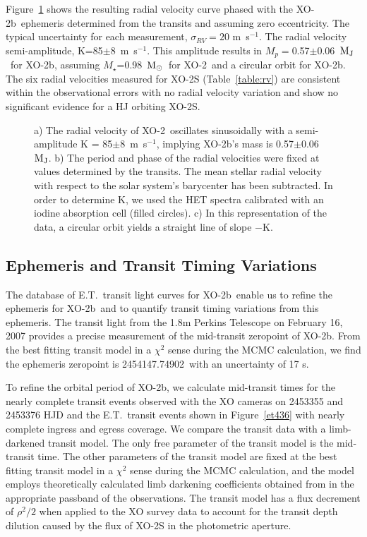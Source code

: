 \documentclass{emulateapj}
\newcommand{\mps}{m~s$^{-1}$}
\newcommand{\Msun}{${\rm M_\odot}$}
\newcommand{\Mjup}{${\rm M_J}$}
\newcommand{\xonb}{XO-2b}
\newcommand{\xon}{XO-2}
\newcommand{\vMs}{0.98}
\newcommand{\vrvK}{85}
\newcommand{\ervK}{8}
\newcommand{\vjd}{2454147.74902}
\newcommand{\vMp}{0.57}
\newcommand{\eMp}{0.06}
\begin{document}
Figure~\ref{rvnorth} shows the resulting radial velocity curve phased
with the \xonb\ ephemeris determined from the transits and assuming
zero eccentricity.  The typical uncertainty for each measurement,
$\sigma_{RV}=20$ \mps.  The radial velocity semi-amplitude,
K=\vrvK$\pm$\ervK\ \mps.  This amplitude results in
$M_{p}=$\vMp$\pm$\eMp\ \Mjup\ for \xonb, assuming $M_{\star}$=\vMs\
\Msun\ for \xon\ and a circular orbit for \xonb.  The six radial
velocities measured for \xon S (Table~\ref{table:rv}) are consistent
within the observational errors with no radial velocity variation and
show no significant evidence for a HJ orbiting \xon S.


\begin{figure}
\caption{a) The radial velocity of \xon\ oscillates sinusoidally with a
semi-amplitude K = \vrvK$\pm$\ervK\ \mps, implying \xonb's mass is
\vMp$\pm$\eMp\ \Mjup. b) The
period and phase of the radial velocities were fixed at values
determined by the transits. The mean stellar radial velocity with
respect to the solar system's barycenter has been subtracted.  In
order to determine K, we used the HET spectra calibrated with an
iodine absorption cell (filled circles).   c) In this representation
of the data, a circular orbit yields a straight line of slope $-$K.
\label{rvnorth}}
\end{figure}


\subsection{Ephemeris and Transit Timing Variations}\label{sec:ttv}

The database of E.T.\ transit light curves for \xonb\ enable us to
refine the ephemeris for \xonb\ and to quantify transit timing
variations from this ephemeris.  The transit light from the 1.8m
Perkins Telescope on February 16, 2007 provides a precise measurement
of the mid-transit zeropoint of \xonb.  From the best fitting transit
model in a $\chi^{2}$ sense during the MCMC calculation,
we find the ephemeris zeropoint is
\vjd\ with an uncertainty of 17 s.

To refine the orbital period of \xonb, we calculate mid-transit times
for the nearly complete transit events observed with the XO cameras on
2453355 and 2453376 HJD and the E.T.\ transit events shown in
Figure~\ref{et436} with nearly complete ingress and egress coverage.
We compare the transit data with a limb-darkened transit model.  The
only free parameter of the transit model is the mid-transit time.  The
other parameters of the transit model are fixed at the best fitting
transit model in a $\chi^{2}$ sense during the MCMC calculation, and
the model employs theoretically calculated limb darkening coefficients
obtained from \citet{CLA00} in the appropriate passband of the
observations.  The transit model has a flux decrement of $\rho^{2}/2$
when applied to the XO survey data to account for the transit depth
dilution caused by the flux of \xon S in the photometric aperture.
\end{document}
